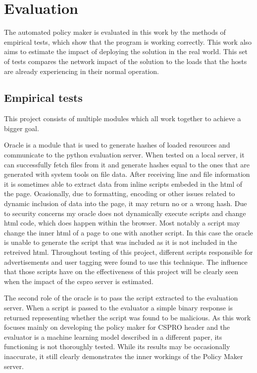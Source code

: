 \begin{description}
\begin{figure}

	\label{code:initial}
\end{figure}

\section{Evaluation}

The automated policy maker is evaluated in this work by the methods of empirical tests, which show that the program is working correctly.
This work also aims to estimate the impact of deploying the solution in the real world.
This set of tests compares the network impact of the solution to the loads that the hosts are already experiencing in their normal operation.

\subsection{Empirical tests}

This project consists of multiple modules which all work together to achieve a bigger goal.

Oracle is a module that is used to generate hashes of loaded resources and communicate to the python evaluation server.
When tested on a local server, it can successfully fetch files from it and generate hashes equal to the ones that are generated with system tools on file data.
After receiving line and file information it is sometimes able to extract data from inline scripts embeded in the html of the page.
Ocasionally, due to formatting, encoding or other issues related to dynamic inclusion of data into the page, it may return no or a wrong hash.
Due to security concerns my oracle does not dynamically execute scripts and change html code, which does happen within the browser.
Most notably a script may change the inner html of a page to one with another script.
In this case the oracle is unable to generate the script that was included as it is not included in the retreived html.
Throughout testing of this project, different scripts responsible for advertisements and user tagging were found to use this technique.
The influence that those scripts have on the effectiveness of this project will be clearly seen when the impact of the cspro server is estimated.

The second role of the oracle is to pass the script extracted to the evaluation server.
When a script is passed to the evaluator a simple binary response is returned representing whether the script was found to be malicious.
As this work focuses mainly on developing the policy maker for CSPRO header and the evaluator is a machine learning model described in a different paper, its functioning is not thoroughly tested.
While its results may be occasionally inaccurate, it still clearly demonstrates the inner workings of the Policy Maker server.


\end{description}

